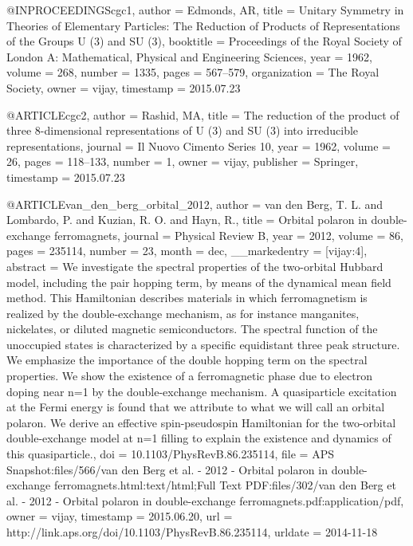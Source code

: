 @INPROCEEDINGS{cgc1,
  author = {Edmonds, AR},
  title = {Unitary Symmetry in Theories of Elementary Particles: The Reduction
	of Products of Representations of the Groups U (3) and SU (3)},
  booktitle = {Proceedings of the Royal Society of London A: Mathematical, Physical
	and Engineering Sciences},
  year = {1962},
  volume = {268},
  number = {1335},
  pages = {567--579},
  organization = {The Royal Society},
  owner = {vijay},
  timestamp = {2015.07.23}
}

@ARTICLE{cgc2,
  author = {Rashid, MA},
  title = {The reduction of the product of three 8-dimensional representations
	of U (3) and SU (3) into irreducible representations},
  journal = {Il Nuovo Cimento Series 10},
  year = {1962},
  volume = {26},
  pages = {118--133},
  number = {1},
  owner = {vijay},
  publisher = {Springer},
  timestamp = {2015.07.23}
}

@ARTICLE{van_den_berg_orbital_2012,
  author = {van den Berg, T. L. and Lombardo, P. and Kuzian, R. O. and Hayn,
	R.},
  title = {Orbital polaron in double-exchange ferromagnets},
  journal = {Physical Review B},
  year = {2012},
  volume = {86},
  pages = {235114},
  number = {23},
  month = dec,
  __markedentry = {[vijay:4]},
  abstract = {We investigate the spectral properties of the two-orbital Hubbard
	model, including the pair hopping term, by means of the dynamical
	mean field method. This Hamiltonian describes materials in which
	ferromagnetism is realized by the double-exchange mechanism, as for
	instance manganites, nickelates, or diluted magnetic semiconductors.
	The spectral function of the unoccupied states is characterized by
	a specific equidistant three peak structure. We emphasize the importance
	of the double hopping term on the spectral properties. We show the
	existence of a ferromagnetic phase due to electron doping near n=1
	by the double-exchange mechanism. A quasiparticle excitation at the
	Fermi energy is found that we attribute to what we will call an orbital
	polaron. We derive an effective spin-pseudospin Hamiltonian for the
	two-orbital double-exchange model at n=1 filling to explain the existence
	and dynamics of this quasiparticle.},
  doi = {10.1103/PhysRevB.86.235114},
  file = {APS Snapshot:files/566/van den Berg et al. - 2012 - Orbital polaron in double-exchange ferromagnets.html:text/html;Full Text PDF:files/302/van den Berg et al. - 2012 - Orbital polaron in double-exchange ferromagnets.pdf:application/pdf},
  owner = {vijay},
  timestamp = {2015.06.20},
  url = {http://link.aps.org/doi/10.1103/PhysRevB.86.235114},
  urldate = {2014-11-18}
}


